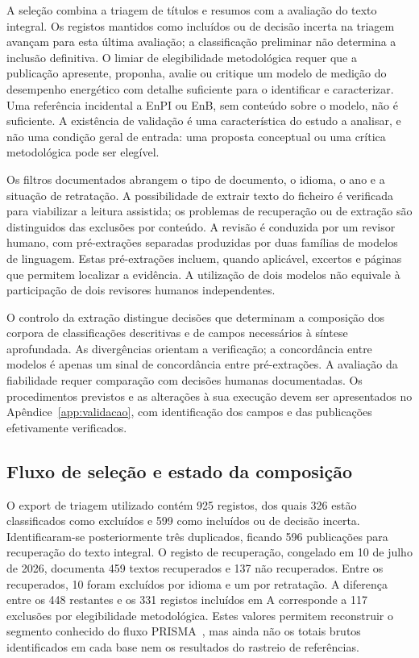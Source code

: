 A seleção combina a triagem de títulos e resumos com a avaliação do
texto integral. Os registos mantidos como incluídos ou de decisão
incerta na triagem avançam para esta última avaliação; a classificação
preliminar não determina a inclusão definitiva. O limiar de elegibilidade
metodológica requer que a publicação apresente, proponha, avalie ou
critique um modelo de medição do desempenho energético com detalhe
suficiente para o identificar e caracterizar. Uma referência incidental
a EnPI ou EnB, sem conteúdo sobre o modelo, não é suficiente. A existência
de validação é uma característica do estudo a analisar, e não uma
condição geral de entrada: uma proposta conceptual ou uma crítica
metodológica pode ser elegível.

Os filtros documentados abrangem o tipo de documento, o idioma, o ano
e a situação de retratação. A possibilidade de extrair texto do ficheiro
é verificada para viabilizar a leitura assistida; os problemas de
recuperação ou de extração são distinguidos das exclusões por conteúdo.
A revisão é conduzida por um revisor humano, com pré-extrações separadas
produzidas por duas famílias de modelos de linguagem. Estas pré-extrações
incluem, quando aplicável, excertos e páginas que permitem localizar a
evidência. A utilização de dois modelos não equivale à participação de
dois revisores humanos independentes.

O controlo da extração distingue decisões que determinam a composição
dos corpora de classificações descritivas e de campos necessários à
síntese aprofundada. As divergências orientam a verificação; a
concordância entre modelos é apenas um sinal de concordância entre
pré-extrações. A avaliação da fiabilidade requer comparação com decisões
humanas documentadas. Os procedimentos previstos e as alterações à sua
execução devem ser apresentados no Apêndice~\ref{app:validacao}, com
identificação dos campos e das publicações efetivamente verificados.

\subsection{Fluxo de seleção e estado da composição}

O export de triagem utilizado contém 925 registos, dos quais 326 estão
classificados como excluídos e 599 como incluídos ou de decisão incerta.
Identificaram-se posteriormente três duplicados, ficando 596 publicações
para recuperação do texto integral. O registo de recuperação, congelado
em 10 de julho de 2026, documenta 459 textos recuperados e 137 não
recuperados. Entre os recuperados, 10 foram excluídos por idioma e um
por retratação. A diferença entre os 448 restantes e os 331 registos
incluídos em A corresponde a 117 exclusões por elegibilidade metodológica.
Estes valores permitem reconstruir o segmento conhecido do fluxo
PRISMA~\cite{Page2021PRISMA}, mas ainda não os totais brutos identificados
em cada base nem os resultados do rastreio de referências.

